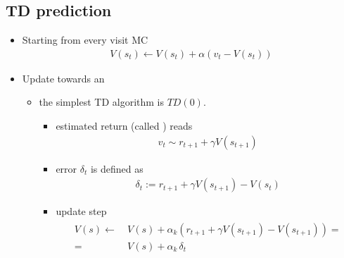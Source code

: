 \documentclass[letterpaper,10pt,english]{jupyterBook}
\begin{document}
\subsection{TD prediction}
\label{\detokenize{ch/rl/mdp_sol_rl:td-prediction}}\begin{itemize}
\item {} 
\sphinxAtStartPar
Starting from every visit MC
\begin{equation*}
\begin{split}V(s_t) \leftarrow V(s_t) + \alpha (v_t - V(s_t))\end{split}
\end{equation*}
\item {} 
\sphinxAtStartPar
Update towards an 
\begin{itemize}
\item {} 
\sphinxAtStartPar
the simplest TD algorithm is \(TD(0)\).
\begin{itemize}
\item {} 
\sphinxAtStartPar
estimated return (called ) reads
\begin{equation*}
\begin{split}v_t \sim r_{t+1} + \gamma V(s_{t+1}) \end{split}
\end{equation*}
\item {} 
\sphinxAtStartPar
{} error \(\delta_t\) is defined as
\begin{equation*}
\begin{split}\delta_t := r_{t+1} + \gamma V(s_{t+1}) - V(s_t)\end{split}
\end{equation*}
\item {} 
\sphinxAtStartPar
update step
\begin{equation*}
\begin{split}\begin{aligned}
         V(s)
         \leftarrow & \ V(s) + \alpha_k \left( r_{t+1} + \gamma V(s_{t+1}) - V(s_{t+1}) \right) = \\
                  = & \ V(s) + \alpha_k \, \delta_t
       \end{aligned}\end{split}
\end{equation*}
\end{itemize}


\end{itemize}
\end{itemize}
\end{document}
